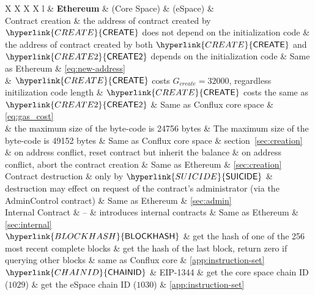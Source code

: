 \begin{center}
	\begin{tabu}{X X X X l}%
			\toprule
				&  
			\textbf{Ethereum} & \textbf{{\name}} (Core Space) &  \textbf{{\name}} (eSpace) & \\
			\midrule
			Contract creation & the address of contract created by $\hyperlink{CREATE}{\op{CREATE}}$ does not depend on the initialization code  &  the address of contract created by both $\hyperlink{CREATE}{\op{CREATE}}$ and $\hyperlink{CREATE2}{\op{CREATE2}}$ depends on the initialization code & Same as Ethereum &  \cref{eq:new-address} \\
			 & 
			$\hyperlink{CREATE}{\op{CREATE}}$ costs $G_{create}=32000$, regardless initilization code length	
			& $\hyperlink{CREATE}{\op{CREATE}}$ costs the same as $\hyperlink{CREATE2}{\op{CREATE2}}$  & Same as Conflux core space & \cref{eq:gas_cost} \\
			& the maximum size of the byte-code is 24756 bytes & The maximum size of the byte-code is 49152 bytes  & Same as Conflux core space & section~\ref{sec:creation}\\
			& on address conflict, reset contract but inherit the balance &  
			on address conflict, abort the contract creation   
			& Same as Ethereum
			& \cref{sec:creation}  \smallskip\\
			\hline
			Contract destruction & only by $\hyperlink{SUICIDE}{\op{SUICIDE}}$ & 
			destruction may effect on request of the contract's administrator
			(via the AdminControl contract) & Same as Ethereum & \cref{sec:admin}\\
			\midrule
			Internal Contract & -- & introduces internal contracts & Same as Ethereum 
			& \cref{sec:internal} \smallskip\\
			\hline
			$\hyperlink{BLOCKHASH}{\op{BLOCKHASH}}$ 	&  get the hash of one of the 256 most recent complete blocks	& get the hash of the last block, return zero if querying other blocks	& same as Conflux core & \cref{app:instruction-set}\\
			\hline
			$\hyperlink{CHAINID}{\op{CHAINID}}$ 	& EIP-1344	&  get the {\name} core space chain ID ($1029$)	& get the {\name} eSpace chain ID ($1030$) & \cref{app:instruction-set}\\

\end{tabu}
\end{center}
